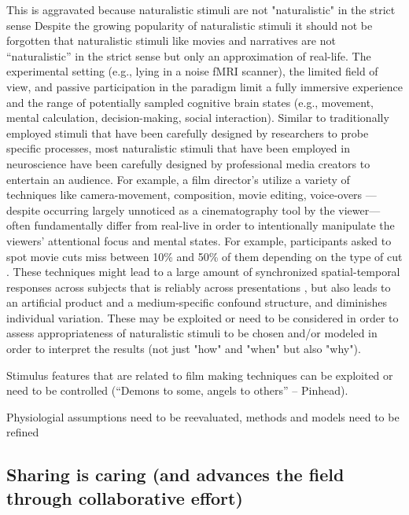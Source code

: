 
%
This is aggravated because naturalistic stimuli are not "naturalistic" in the
strict sense
%
Despite the growing popularity of naturalistic stimuli it should not be
forgotten that naturalistic stimuli like movies and narratives are not
``naturalistic'' in the strict sense but only an approximation of real-life.
%
The experimental setting (e.g., lying in a noise fMRI scanner), the limited
field of view, and passive participation in the paradigm limit a fully immersive
experience and the range of potentially sampled cognitive brain states (e.g.,
movement, mental calculation, decision-making, social interaction).
%
Similar to traditionally employed stimuli that have been carefully designed by
researchers to probe specific processes, most naturalistic stimuli that have
been employed in neuroscience have been carefully designed by professional media
creators to entertain an audience.
%
For example, a film director's utilize a variety of techniques like
camera-movement, composition, movie editing, voice-overs
\citep{brown2012cinematography, dancyger2011film-technique, katz1991film,
mercado2011filmmakers}---despite occurring largely unnoticed as a cinematography
tool by the viewer---often fundamentally differ from real-live in order to
intentionally manipulate the viewers' attentional focus and mental states.
%
For example, participants asked to spot movie cuts miss between 10\% and 50\% of
them depending on the type of cut \citep{smith2008edit}.
%
These techniques might lead to a large amount of synchronized spatial-temporal
responses across subjects that is reliably across presentations
\citep{hasson2008neurocinematics}, but also leads to an artificial product and a
medium-specific confound structure, and diminishes individual variation.
%
These may be exploited or need to be considered in order to assess
appropriateness of naturalistic stimuli to be chosen and/or modeled in order to
interpret the results (not just "how" and "when" but also "why").

%
Stimulus features that are related to film making techniques can be exploited
\citep{haeusler2022processing, kauttonen2018brain} or need to be controlled
(``Demons to some, angels to others'' -- Pinhead).

%
Physiologial assumptions need to be reevaluated, methods and models need to be refined


\subsection{Sharing is caring (and advances the field through collaborative
effort)}

